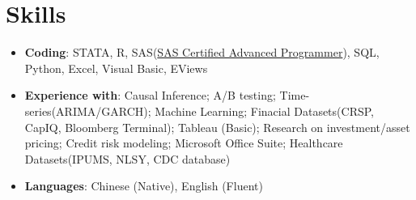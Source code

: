 \documentclass{resume}
\begin{document}
\section{Skills}
\begin{itemize}[parsep=0.25ex]
  \item \textbf{Coding}:
    STATA, R, SAS(\href{https://www.youracclaim.com/badges/c4bce10e-7398-4203-9d11-f9c6723749a4/linked_in_profile}{SAS Certified Advanced Programmer}), SQL, Python, Excel, Visual Basic, EViews
    

  \item \textbf{Experience with}:
   Causal Inference; A/B testing; Time-series(ARIMA/GARCH); Machine Learning; Finacial Datasets(CRSP, CapIQ, Bloomberg Terminal); Tableau (Basic); Research on investment/asset pricing; Credit risk modeling; Microsoft Office Suite; Healthcare Datasets(IPUMS, NLSY, CDC database)
   

 \item \textbf{Languages}: 
  Chinese (Native), English (Fluent)  
 
  
\end{itemize}


  
  
  


%
%
\end{document}
